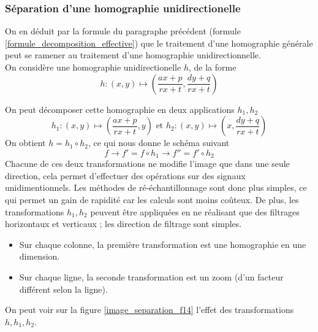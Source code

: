 \subsubsection{Séparation d'une homographie unidirectionelle}
\label{homobox_paragraph}
On en déduit par la formule du paragraphe précédent (formule \ref{formule_decomposition_effective}) que le traitement d'une homographie générale peut se ramener au traitement d'une homographie unidirectionnelle.\\
On considère une homographie unidirectionelle $h$, de la forme 
\begin{equation*}
h:(x,y)\mapsto \left(\frac{ax+p}{rx+t},\frac{dy+q}{rx+t}\right)
\end{equation*}

On peut décomposer cette homographie en deux applications $h_1 , h_2$
\begin{equation*}
h_1:(x,y) \mapsto \left(\frac{ax+p}{rx+t},y\right) \text{ et } h_2:(x,y) \mapsto \left(x,\frac{dy+q}{rx+t}\right)
\end{equation*}
On obtient $h=h_1  \circ h_2$, ce qui nous donne le schéma suivant 
\begin{equation*}
f\longrightarrow f'=f\circ h_1 \longrightarrow f''=f'\circ h_2
\end{equation*}
Chacune de ces deux transformations ne modifie l'image que dans une seule direction, cela permet d'effectuer des opérations sur des signaux unidimentionnels. Les méthodes de ré-échantillonnage sont donc plus simples, ce qui permet un gain de rapidité car les calculs sont moins coûteux. De plus, les transformations $h_1,h_2$ peuvent être appliquées en ne réalisant que des filtrages horizontaux et verticaux ; les direction de filtrage sont simples.
\begin{itemize}
\item Sur chaque colonne, la première transformation est une homographie en une dimension.
\item Sur chaque ligne, la seconde transformation est un zoom (d'un facteur différent selon la ligne).
\end{itemize}
On peut voir sur la figure \ref{image_separation_f14} l'effet des transformations $h,h_1,h_2$.


